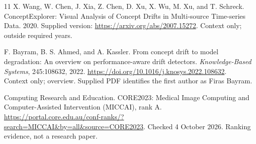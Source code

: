 \documentclass[10pt,a4paper]{article}
\begin{document}
\begin{thebibliography}{11}
X. Wang, W. Chen, J. Xia, Z. Chen, D. Xu, X. Wu, M. Xu, and T. Schreck.
ConceptExplorer: Visual Analysis of Concept Drifts in Multi-source Time-series Data. 2020.
Supplied version: \url{https://arxiv.org/abs/2007.15272}.
Context only; outside required years.

F. Bayram, B. S. Ahmed, and A. Kassler.
From concept drift to model degradation: An overview on performance-aware drift detectors.
\emph{Knowledge-Based Systems}, 245:108632, 2022.
\url{https://doi.org/10.1016/j.knosys.2022.108632}.
Context only; overview. Supplied PDF identifies the first author as Firas Bayram.

Computing Research and Education.
CORE2023: Medical Image Computing and Computer-Assisted Intervention (MICCAI), rank A.
\url{https://portal.core.edu.au/conf-ranks/?search=MICCAI&by=all&source=CORE2023}.
Checked 4 October 2026. Ranking evidence, not a research paper.
\end{thebibliography}
\end{document}
